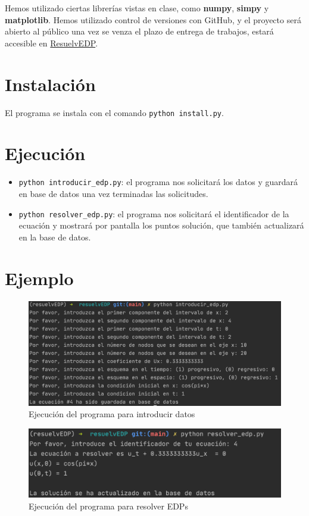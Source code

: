 \documentclass[a4paper,12pt]{article}
\begin{document}
Hemos utilizado ciertas librerías vistas en clase, como \textbf{numpy}, \textbf{simpy} y \textbf{matplotlib}. Hemos utilizado control de versiones con GitHub, y el proyecto será abierto al público una vez se venza el plazo de entrega de trabajos, estará accesible en \href{https://github.com/jdlcgarcia/resuelvEDP}{ResuelvEDP}.

\section*{Instalación}

El programa se instala con el comando \texttt{python install.py}.

\section*{Ejecución}

\begin{itemize}
	\item \texttt{python introducir\_edp.py}: el programa nos solicitará los datos y guardará en base de datos una vez terminadas las solicitudes.
	\item \texttt{python resolver\_edp.py}: el programa nos solicitará el identificador de la ecuación y mostrará por pantalla los puntos solución, que también actualizará en la base de datos.
\end{itemize}

\section*{Ejemplo}

\begin{figure}[H]
  \centering
  \includegraphics[width=12cm]{ejemplo1}
  \caption{Ejecución del programa para introducir datos}
  \label{fig:ejemplo1}
\end{figure}

\begin{figure}[H]
  \centering
  \includegraphics[width=12cm]{ejemplo2}
  \caption{Ejecución del programa para resolver EDPs}
  \label{fig:ejemplo2}
\end{figure}
\end{document}
